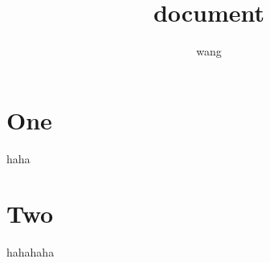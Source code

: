 \documentclass{article}
\title{document}
\author{wang}
\begin{document}
\maketitle
\tableofcontents
\section{One} haha
\section{Two} hahahaha
\end{document}
